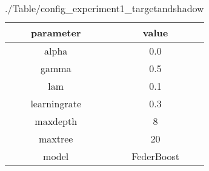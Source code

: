 \begin{table}[h]
\centering
\begin{tabular}{|c|c|}
\hline
parameter & value\\
\hline
alpha & 0.0 \\\hline
gamma & 0.5 \\\hline
lam & 0.1 \\\hline
learningrate & 0.3 \\\hline
maxdepth & 8 \\\hline
maxtree & 20 \\\hline
model & FederBoost \\\hline

\end{tabular}\caption{./Table/config_experiment1_targetandshadow}
\label{tab:./Table/config_experiment1_targetandshadow}
\end{table}
